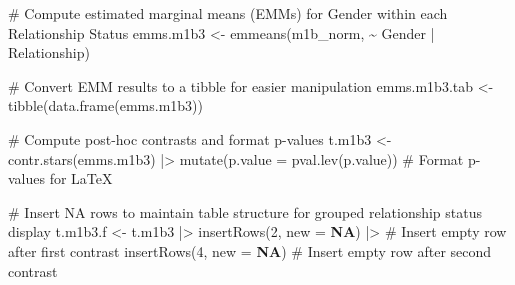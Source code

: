 \documentclass[
  bookmarksnumbered]{article}
\newenvironment{Shaded}{\begin{snugshade}}{\end{snugshade}}
\newcommand{\AttributeTok}[1]{\textcolor[rgb]{0.80,0.80,0.80}{#1}}
\newcommand{\CommentTok}[1]{\textcolor[rgb]{0.50,0.62,0.50}{#1}}
\newcommand{\ConstantTok}[1]{\textcolor[rgb]{0.86,0.64,0.64}{\textbf{#1}}}
\newcommand{\DecValTok}[1]{\textcolor[rgb]{0.86,0.86,0.80}{#1}}
\newcommand{\FunctionTok}[1]{\textcolor[rgb]{0.94,0.94,0.56}{#1}}
\newcommand{\NormalTok}[1]{\textcolor[rgb]{0.80,0.80,0.80}{#1}}
\newcommand{\OtherTok}[1]{\textcolor[rgb]{0.94,0.94,0.56}{#1}}
\newcommand{\SpecialCharTok}[1]{\textcolor[rgb]{0.86,0.64,0.64}{#1}}
\begin{document}
\begin{Shaded}
\begin{Highlighting}[]
\CommentTok{\# Compute estimated marginal means (EMMs) for Gender within each Relationship Status}
\NormalTok{emms.m1b3 }\OtherTok{\textless{}{-}} \FunctionTok{emmeans}\NormalTok{(m1b\_norm, }\SpecialCharTok{\textasciitilde{}}\NormalTok{ Gender }\SpecialCharTok{|}\NormalTok{ Relationship)}

\CommentTok{\# Convert EMM results to a tibble for easier manipulation}
\NormalTok{emms.m1b3.tab }\OtherTok{\textless{}{-}} \FunctionTok{tibble}\NormalTok{(}\FunctionTok{data.frame}\NormalTok{(emms.m1b3))}

\CommentTok{\# Compute post{-}hoc contrasts and format p{-}values}
\NormalTok{t.m1b3 }\OtherTok{\textless{}{-}} \FunctionTok{contr.stars}\NormalTok{(emms.m1b3) }\SpecialCharTok{|\textgreater{}}
  \FunctionTok{mutate}\NormalTok{(}\AttributeTok{p.value =} \FunctionTok{pval.lev}\NormalTok{(p.value)) }\CommentTok{\# Format p{-}values for LaTeX}

\CommentTok{\# Insert NA rows to maintain table structure for grouped relationship status display}
\NormalTok{t.m1b3.f }\OtherTok{\textless{}{-}}\NormalTok{ t.m1b3 }\SpecialCharTok{|\textgreater{}}
  \FunctionTok{insertRows}\NormalTok{(}\DecValTok{2}\NormalTok{, }\AttributeTok{new =} \ConstantTok{NA}\NormalTok{) }\SpecialCharTok{|\textgreater{}} \CommentTok{\# Insert empty row after first contrast}
  \FunctionTok{insertRows}\NormalTok{(}\DecValTok{4}\NormalTok{, }\AttributeTok{new =} \ConstantTok{NA}\NormalTok{) }\CommentTok{\# Insert empty row after second contrast}


\end{Highlighting}
\end{Shaded}
\end{document}
